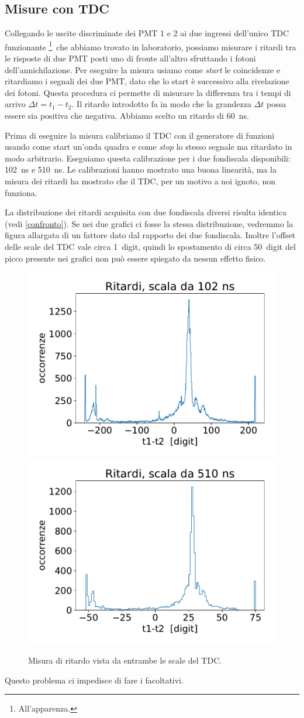 \subsection{Misure con TDC}

Collegando le uscite discriminate dei PMT 1 e 2 ai due ingressi dell'unico TDC funzionante%
\footnote{All'apparenza.}%
\,che abbiamo trovato in laboratorio, possiamo misurare i ritardi tra le risposte di due PMT posti uno di fronte all'altro sfruttando i fotoni dell'annichilazione. Per eseguire la misura usiamo come \emph{start} le coincidenze e ritardiamo i segnali dei due PMT, dato che lo start è successivo alla rivelazione dei fotoni. Questa procedura ci permette di misurare la differenza tra i tempi di arrivo $\Delta t=t_1-t_2$. Il ritardo introdotto fa in modo che la grandezza $\Delta t$ possa essere sia positiva che negativa. Abbiamo scelto un ritardo di \SI{60}{ns}.

Prima di eseguire la misura calibriamo il TDC con il generatore di funzioni usando come start un'onda quadra e come \emph{stop} lo stesso segnale ma ritardato in modo arbitrario.
Eseguiamo questa calibrazione per i due fondiscala disponibili: \SI{102}{ns} e \SI{510}{ns}.
Le calibrazioni hanno mostrato una buona linearità, ma la misura dei ritardi ha mostrato che il TDC, per un motivo a noi ignoto, non funziona.

La distribuzione dei ritardi acquisita con due fondiscala diversi risulta identica (vedi \autoref{confronto}).
Se nei due grafici ci fosse la stessa distribuzione, vedremmo la figura allargata di un fattore dato dal rapporto dei due fondiscala. Inoltre l'offset delle scale del TDC vale circa \SI{1}{digit}, quindi lo spostamento di circa \SI{50}{digit} del picco presente nei grafici non può essere spiegato da nessun effetto fisico.

\begin{figure}[h]
\centering
\subfloat
{\includegraphics[width=18 em]{immagini/100}
}
\subfloat
{\includegraphics[width=18 em]{immagini/500}
}

\caption{Misura di ritardo vista da entrambe le scale del TDC.}
\label{confronto}
\end{figure}

Questo problema ci impedisce di fare i facoltativi.